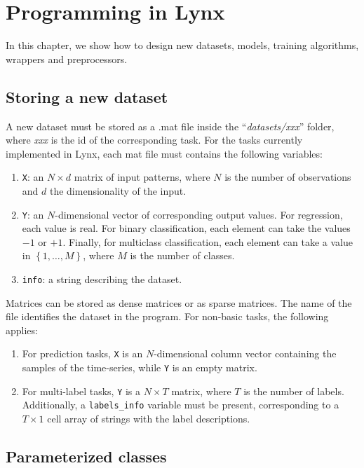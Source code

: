 \chapter{Programming in Lynx}
\label{chap:programminglynx}

In this chapter, we show how to design new datasets, models, training algorithms, wrappers and preprocessors.

\section{Storing a new dataset}

A new dataset must be stored as a .mat file inside the ``\textit{datasets/xxx}'' folder, where \textit{xxx} is the id of the corresponding task. 
For the tasks currently implemented in Lynx, each mat file must contains the following variables:

\begin{enumerate}
	\item \verb|X|: an $N \times d$ matrix of input patterns, where $N$ is the number of observations and $d$ the dimensionality of the input.
	\item \verb|Y|: an $N$-dimensional vector of corresponding output values. For regression, each value is real. For binary classification, each element can take the values $-1$ or $+1$. Finally, for multiclass classification, each element can take a value in $\left\{1, \ldots, M\right\}$, where $M$ is the number of classes.
	\item \verb|info|: a string describing the dataset.
\end{enumerate}

Matrices can be stored as dense matrices or as sparse matrices. The name of the file identifies the dataset in the program. For non-basic tasks, the following applies:

\begin{enumerate}
	\item For prediction tasks, \verb|X| is an $N$-dimensional column vector containing the samples of the time-series, while \verb|Y| is an empty matrix.
	\item For multi-label tasks, \verb|Y| is a $N \times T$ matrix, where $T$ is the number of labels. Additionally, a \verb|labels_info| variable must be present, corresponding to a $T\times1$ cell array of strings with the label descriptions.
\end{enumerate}

\section{Parameterized classes}
\label{sec:parameterizedclasses}

